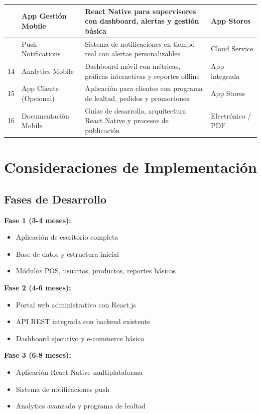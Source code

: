 \documentclass[12pt,letterpaper]{article}
\begin{document}
\begin{longtable}{|>{\centering}p{1cm}|p{6cm}|p{8cm}|>{\centering\arraybackslash}p{3cm}|}
12 & App Gestión Mobile & React Native para supervisores con dashboard, alertas y gestión básica & App Stores \\
\hline

13 & Push Notifications & Sistema de notificaciones en tiempo real con alertas personalizables & Cloud Service \\
\hline

14 & Analytics Mobile & Dashboard móvil con métricas, gráficas interactivas y reportes offline & App integrada \\
\hline

15 & App Cliente (Opcional) & Aplicación para clientes con programa de lealtad, pedidos y promociones & App Stores \\
\hline

16 & Documentación Mobile & Guías de desarrollo, arquitectura React Native y procesos de publicación & Electrónico / PDF \\
\hline
\end{longtable}

\section{Consideraciones de Implementación}

\subsection{Fases de Desarrollo}
\textbf{Fase 1 (3-4 meses):}
\begin{itemize}
    \item Aplicación de escritorio completa
    \item Base de datos y estructura inicial
    \item Módulos POS, usuarios, productos, reportes básicos
\end{itemize}

\textbf{Fase 2 (4-6 meses):}
\begin{itemize}
    \item Portal web administrativo con React.js
    \item API REST integrada con backend existente
    \item Dashboard ejecutivo y e-commerce básico
\end{itemize}

\textbf{Fase 3 (6-8 meses):}
\begin{itemize}
    \item Aplicación React Native multiplataforma
    \item Sistema de notificaciones push
    \item Analytics avanzado y programa de lealtad
\end{itemize}
\end{document}
